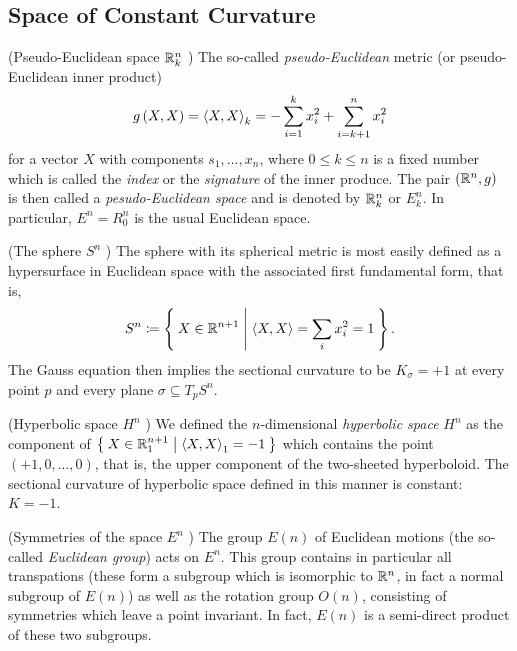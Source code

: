 \documentclass[../main.tex]{subfiles}
\begin{document}
\subsection{Space of Constant Curvature}
\begin{definition}(Pseudo-Euclidean space $\mathbb{R}^n_k$ {\autocite[][Chapter~7A]{kuhnelwolfgang_2006}})
The so-called \textit{pseudo-Euclidean} metric (or pseudo-Euclidean inner product)
\begin{equation*}
g\left(X,X\right)
=\left\langle{X},{X}\right\rangle_k
=-\sum_{i=1}^{k}x_i^2+\sum_{i=k+1}^{n}x_i^2
\end{equation*}
for a vector $X$ with components $s_1,\dots,x_n$,
where $0\le k\le n$ is a fixed number which is called the \textit{index} or the \textit{signature} of the inner produce.
The pair $\left(\mathbb{R}^n,g\right)$ is then called a \textit{pesudo-Euclidean space}
and is denoted by $\mathbb{R}^n_k$ or $E^n_k$.
In particular, $E^n=R^n_0$ is the usual Euclidean space.
\end{definition}
\begin{definition}(The sphere $S^n$ {\autocite[][Chapter~7A]{kuhnelwolfgang_2006}})
The sphere with its spherical metric is most easily defined as a hypersurface in Euclidean space with the associated first fundamental form, that is,
\begin{equation*}
S^n\coloneqq\Set{X\in\mathbb{R}^{n+1}|\left\langle{X},{X}\right\rangle=\sum_ix_i^2=1}\text{.}
\end{equation*}
The Gauss equation then implies the sectional curvature to be $K_\sigma=+1$ at every point $p$ and every plane $\sigma\subseteq T_pS^n$.
\end{definition}
\begin{definition}(Hyperbolic space $H^n$ {\autocite[][Chapter~7A]{kuhnelwolfgang_2006}})
We defined the $n$-dimensional \textit{hyperbolic space} $H^n$
as the component of $\Set{X\in\mathbb{R}^{n+1}_1|\left\langle{X},{X}\right\rangle_1=-1}$
which contains the point $\left(+1,0,\dots,0\right)$,
that is, the upper component of the two-sheeted hyperboloid.
The sectional curvature of hyperbolic space defined in this manner is constant: $K=-1$.
\end{definition}
\begin{definition}(Symmetries of the space $E^n$ {\autocite[][Chapter~7A]{kuhnelwolfgang_2006}})\label{Group:Euclidean}
The group $E\left(n\right)$ of Euclidean motions
(the so-called \textit{Euclidean group})
acts on $E^n$.
This group contains in particular all transpations
(these form a subgroup which is isomorphic to $\mathbb{R}^n$, in fact a normal subgroup of $E\left(n\right)$)
as well as the rotation group $O\left(n\right)$,
consisting of symmetries which leave a point invariant.
In fact, $E\left(n\right)$ is a semi-direct product of these two subgroups.
\end{definition}
\end{document}
